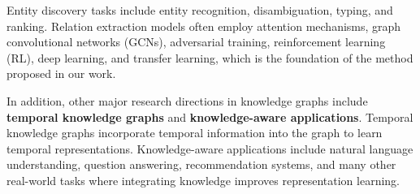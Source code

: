Entity discovery tasks include entity recognition, disambiguation, typing, and ranking. Relation extraction models often employ attention mechanisms, graph convolutional networks (GCNs), adversarial training, reinforcement learning (RL), deep learning, and transfer learning, which is the foundation of the method proposed in our work.

In addition, other major research directions in knowledge graphs include \textbf{temporal knowledge graphs} and \textbf{knowledge-aware applications}. Temporal knowledge graphs incorporate temporal information into the graph to learn temporal representations. Knowledge-aware applications include natural language understanding, question answering, recommendation systems, and many other real-world tasks where integrating knowledge improves representation learning.









